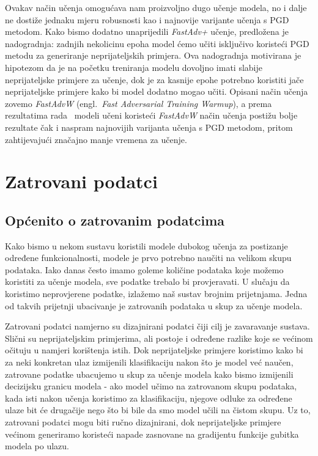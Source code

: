 \documentclass[times, utf8, zavrsni, numeric]{fer}
\begin{document}
\pagebreak

Ovakav način učenja omogućava nam proizvoljno dugo učenje modela, no i dalje ne dostiže jednaku mjeru robusnosti kao i najnovije varijante učenja s PGD metodom.
Kako bismo dodatno unaprijedili \textit{FastAdv+} učenje, predložena je nadogradnja: zadnjih nekolicinu epoha model ćemo učiti isključivo koristeći PGD metodu za generiranje neprijateljskih primjera. 
Ova nadogradnja motivirana je hipotezom da je na početku treniranja modelu dovoljno imati slabije neprijateljske primjere za učenje, 
dok je za kasnije epohe potrebno koristiti jače neprijateljske primjere kako bi model dodatno mogao učiti. Opisani način učenja zovemo \textit{FastAdvW} (engl.\ \textit{Fast Adversarial Training Warmup}),
a prema rezultatima rada~\cite{li2020towards} modeli učeni koristeći \textit{FastAdvW} način učenja postižu bolje rezultate čak i naspram najnovijih varijanta učenja s PGD metodom, 
pritom zahtijevajući značajno manje vremena za učenje.

\chapter{Zatrovani podatci}

\section{Općenito o zatrovanim podatcima}

Kako bismo u nekom sustavu koristili modele dubokog učenja za postizanje određene funkcionalnosti, modele je prvo potrebno naučiti na velikom skupu podataka. 
Iako danas često imamo goleme količine podataka koje možemo koristiti za učenje modela, sve podatke trebalo bi provjeravati.
U slučaju da koristimo neprovjerene podatke, izlažemo naš sustav brojnim prijetnjama.
Jedna od takvih prijetnji ubacivanje je zatrovanih podataka u skup za učenje modela. 

Zatrovani podatci namjerno su dizajnirani podatci čiji cilj je zavaravanje sustava.
Slični su neprijateljskim primjerima, ali postoje i određene razlike koje se većinom očituju u namjeri korištenja istih.
Dok neprijateljske primjere koristimo kako bi za neki konkretan ulaz izmijenili klasifikaciju nakon što je model već naučen,
zatrovane podatke ubacujemo u skup za učenje modela kako bismo izmijenili decizijsku granicu modela - ako model učimo na zatrovanom skupu podataka,
kada isti nakon učenja koristimo za klasifikaciju, njegove odluke za određene ulaze bit će drugačije nego što bi bile da smo model učili na čistom skupu.
Uz to, zatrovani podatci mogu biti ručno dizajnirani, dok neprijateljske primjere većinom generiramo koristeći napade zasnovane na gradijentu funkcije gubitka modela po ulazu.
\end{document}
